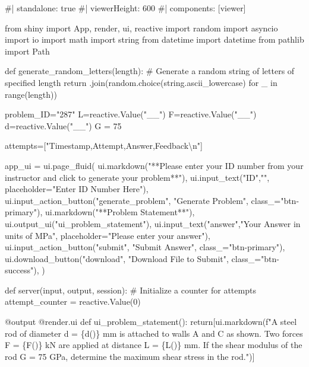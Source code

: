 \documentclass[
  letterpaper,
  DIV=11,
  numbers=noendperiod]{scrreprt}
\newenvironment{Shaded}{\begin{snugshade}}{\end{snugshade}}
\newcommand{\NormalTok}[1]{\textcolor[rgb]{0.00,0.23,0.31}{#1}}
\begin{document}
\begin{Shaded}
\begin{Highlighting}[]
\NormalTok{\#| standalone: true}
\NormalTok{\#| viewerHeight: 600}
\NormalTok{\#| components: [viewer]}

\NormalTok{from shiny import App, render, ui, reactive}
\NormalTok{import random}
\NormalTok{import asyncio}
\NormalTok{import io}
\NormalTok{import math}
\NormalTok{import string}
\NormalTok{from datetime import datetime}
\NormalTok{from pathlib import Path}

\NormalTok{def generate\_random\_letters(length):}
\NormalTok{    \# Generate a random string of letters of specified length}
\NormalTok{    return \textquotesingle{}\textquotesingle{}.join(random.choice(string.ascii\_lowercase) for \_ in range(length)) }

\NormalTok{problem\_ID="287"}
\NormalTok{L=reactive.Value("\_\_")}
\NormalTok{F=reactive.Value("\_\_")}
\NormalTok{d=reactive.Value("\_\_")}
\NormalTok{G = 75}

\NormalTok{attempts=["Timestamp,Attempt,Answer,Feedback\textbackslash{}n"]}

\NormalTok{app\_ui = ui.page\_fluid(}
\NormalTok{    ui.markdown("**Please enter your ID number from your instructor and click to generate your problem**"),}
\NormalTok{    ui.input\_text("ID","", placeholder="Enter ID Number Here"),}
\NormalTok{    ui.input\_action\_button("generate\_problem", "Generate Problem", class\_="btn{-}primary"),}
\NormalTok{    ui.markdown("**Problem Statement**"),}
\NormalTok{    ui.output\_ui("ui\_problem\_statement"),}
\NormalTok{    ui.input\_text("answer","Your Answer in units of MPa", placeholder="Please enter your answer"),}
\NormalTok{    ui.input\_action\_button("submit", "Submit Answer", class\_="btn{-}primary"),}
\NormalTok{    ui.download\_button("download", "Download File to Submit", class\_="btn{-}success"),}
\NormalTok{)}


\NormalTok{def server(input, output, session):}
\NormalTok{    \# Initialize a counter for attempts}
\NormalTok{    attempt\_counter = reactive.Value(0)}

\NormalTok{    @output}
\NormalTok{    @render.ui}
\NormalTok{    def ui\_problem\_statement():}
\NormalTok{        return[ui.markdown(f"A steel rod of diameter d = \{d()\} mm is attached to walls A and C as shown. Two forces F = \{F()\} kN are applied at distance L = \{L()\} mm. If the shear modulus of the rod G = 75 GPa, determine the maximum shear stress in the rod.")]}
    

\end{Highlighting}
\end{Shaded}
\end{document}

